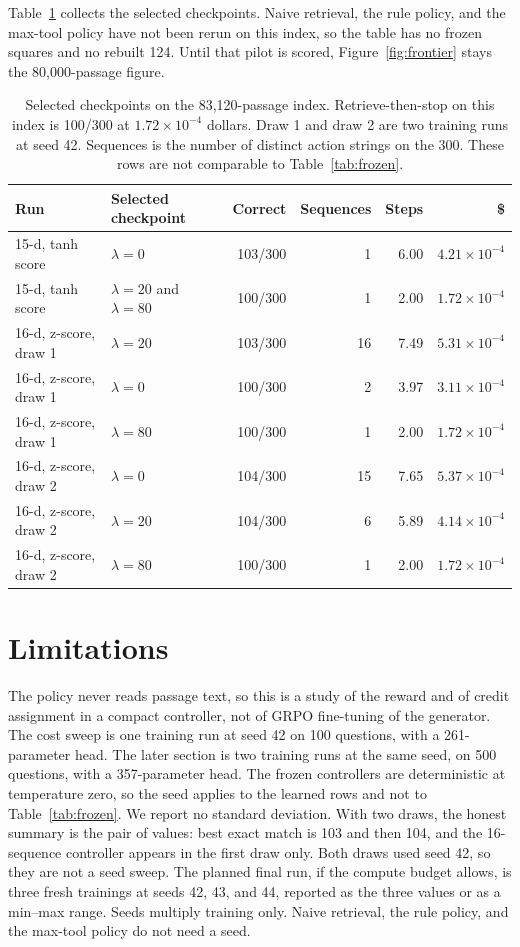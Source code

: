 \documentclass[letterpaper]{article} %
\begin{document}
Table~\ref{tab:zscore} collects the selected checkpoints. Naive retrieval, the rule policy, and the max-tool policy have not been rerun on this index, so the table has no frozen squares and no rebuilt 124. Until that pilot is scored, Figure~\ref{fig:frontier} stays the 80{,}000-passage figure.

\begin{table}[t]
\centering
\setlength{\tabcolsep}{4pt}
\begin{tabular}{llrrrr}
\toprule
Run & Selected checkpoint & Correct & Sequences & Steps & \$ \\
\midrule
15-d, tanh score & \(\lambda{=}0\) & 103/300 & 1 & 6.00 & \(4.21\times 10^{-4}\) \\
15-d, tanh score & \(\lambda{=}20\) and \(\lambda{=}80\) & 100/300 & 1 & 2.00 & \(1.72\times 10^{-4}\) \\
16-d, z-score, draw 1 & \(\lambda{=}20\) & 103/300 & 16 & 7.49 & \(5.31\times 10^{-4}\) \\
16-d, z-score, draw 1 & \(\lambda{=}0\) & 100/300 & 2 & 3.97 & \(3.11\times 10^{-4}\) \\
16-d, z-score, draw 1 & \(\lambda{=}80\) & 100/300 & 1 & 2.00 & \(1.72\times 10^{-4}\) \\
16-d, z-score, draw 2 & \(\lambda{=}0\) & 104/300 & 15 & 7.65 & \(5.37\times 10^{-4}\) \\
16-d, z-score, draw 2 & \(\lambda{=}20\) & 104/300 & 6 & 5.89 & \(4.14\times 10^{-4}\) \\
16-d, z-score, draw 2 & \(\lambda{=}80\) & 100/300 & 1 & 2.00 & \(1.72\times 10^{-4}\) \\
\bottomrule
\end{tabular}
\caption{Selected checkpoints on the 83{,}120-passage index. Retrieve-then-stop on this index is 100/300 at \(1.72\times 10^{-4}\) dollars. Draw 1 and draw 2 are two training runs at seed 42. Sequences is the number of distinct action strings on the 300. These rows are not comparable to Table~\ref{tab:frozen}.}
\label{tab:zscore}
\end{table}

\section{Limitations}
The policy never reads passage text, so this is a study of the reward and of credit assignment in a compact controller, not of GRPO fine-tuning of the generator. The cost sweep is one training run at seed 42 on 100 questions, with a 261-parameter head. The later section is two training runs at the same seed, on 500 questions, with a 357-parameter head. The frozen controllers are deterministic at temperature zero, so the seed applies to the learned rows and not to Table~\ref{tab:frozen}. We report no standard deviation. With two draws, the honest summary is the pair of values: best exact match is 103 and then 104, and the 16-sequence controller appears in the first draw only. Both draws used seed 42, so they are not a seed sweep. The planned final run, if the compute budget allows, is three fresh trainings at seeds 42, 43, and 44, reported as the three values or as a min--max range. Seeds multiply training only. Naive retrieval, the rule policy, and the max-tool policy do not need a seed.
\end{document}
